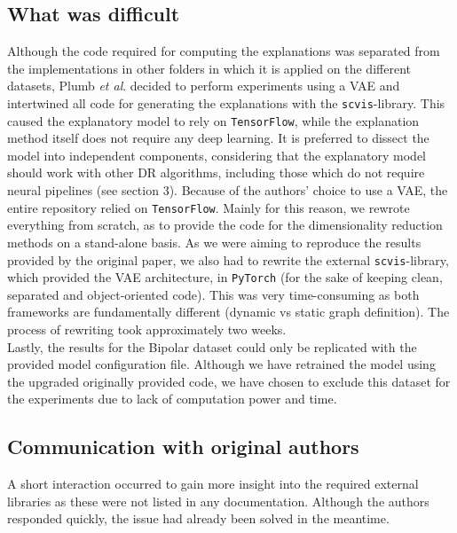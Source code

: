 \subsection{What was difficult}
Although the code required for computing the explanations was separated from the implementations in other folders in which it is applied on the different datasets, Plumb \textit{et al}. decided to perform experiments using a VAE and intertwined all code for generating the explanations with the \texttt{scvis}-library. This caused the explanatory model to rely on \texttt{TensorFlow}, while the explanation method itself does not require any deep learning. It is preferred to dissect the model into independent components, considering that the explanatory model should work with other DR algorithms, including those which do not require neural pipelines (see section 3). Because of the authors' choice to use a VAE, the entire repository relied on \texttt{TensorFlow}. Mainly for this reason, we rewrote everything from scratch, as to provide the code for the dimensionality reduction methods on a stand-alone basis. As we were aiming to reproduce the results provided by the original paper, we also had to rewrite the external \texttt{scvis}-library, which provided the VAE architecture, in \texttt{PyTorch} (for the sake of keeping clean, separated and object-oriented code). This was very time-consuming as both frameworks are fundamentally different (dynamic vs static graph definition). The process of rewriting took approximately two weeks.\\

Lastly, the results for the Bipolar dataset could only be replicated with the provided model configuration file. Although we have retrained the model using the upgraded originally provided code, we have chosen to exclude this dataset for the experiments due to lack of computation power and time.

\subsection{Communication with original authors}
A short interaction occurred to gain more insight into the required external libraries as these were not listed in any documentation. Although the authors responded quickly, the issue had already been solved in the meantime.